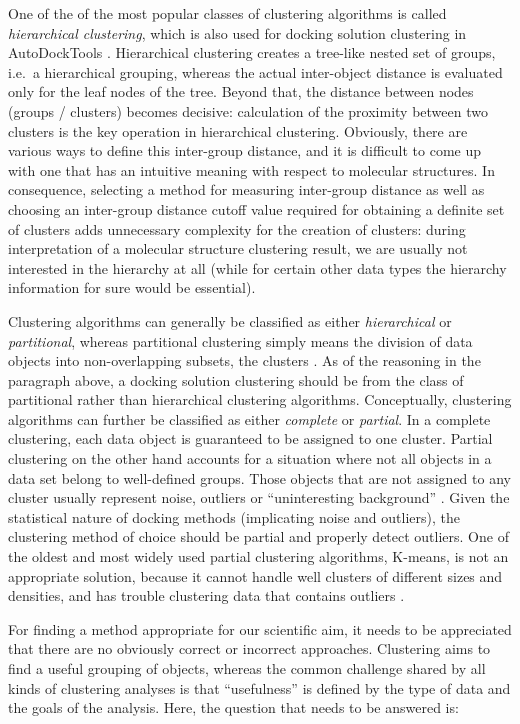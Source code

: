 One of the of the most popular classes of clustering algorithms is called
\textit{hierarchical clustering}, which is also used for docking solution
clustering in AutoDockTools \cite{autodock4_adt_2009}. Hierarchical clustering
creates a tree-like nested set of groups, i.e.\ a hierarchical grouping, whereas
the actual inter-object distance is evaluated only for the leaf nodes of the
tree. Beyond that, the distance between nodes (groups / clusters) becomes
decisive: calculation of the proximity between two clusters is the key operation
in hierarchical clustering. Obviously, there are various ways to define this
inter-group distance, and it is difficult to come up with one that has an
intuitive meaning with respect to molecular structures. In consequence,
selecting a method for measuring inter-group distance as well as choosing an
inter-group distance cutoff value required for obtaining a definite set of
clusters adds unnecessary complexity for the creation of clusters: during
interpretation of a molecular structure clustering result, we are usually not
interested in the hierarchy at all (while for certain other data types the
hierarchy information for sure would be essential).

Clustering algorithms can generally be classified as either
\textit{hierarchical} or \textit{partitional}, whereas partitional clustering
simply means the division of data objects into non-overlapping subsets, the
clusters \cite{tan_data_mining}. As of the reasoning in the paragraph above, a
docking solution clustering should be from the class of partitional rather than
hierarchical clustering algorithms. Conceptually, clustering algorithms can
further be classified as either \textit{complete} or \textit{partial}. In a
complete clustering, each data object is guaranteed to be assigned to one
cluster. Partial clustering on the other hand accounts for a situation where not
all objects in a data set belong to well-defined groups. Those objects that are
not assigned to any cluster usually represent noise, outliers or
\enquote{uninteresting background} \cite{tan_data_mining}. Given the statistical
nature of docking methods (implicating noise and outliers), the clustering
method of choice should be partial and properly detect outliers. One of the
oldest and most widely used partial clustering algorithms, K-means, is not an
appropriate solution, because it cannot handle well clusters of different sizes
and densities, and has trouble clustering data that contains outliers
\cite{tan_data_mining}.

For finding a method appropriate for our scientific aim, it needs to be
appreciated that there are no obviously correct or incorrect approaches.
Clustering aims to find a useful grouping of objects, whereas the common
challenge shared by all kinds of clustering analyses is that
\enquote{usefulness} is defined by the type of data and the goals of the
analysis. Here, the question that needs to be answered is:

